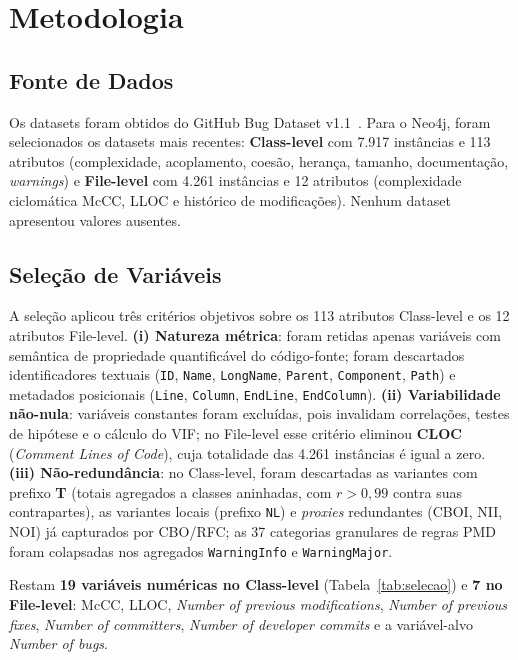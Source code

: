\documentclass[conference]{IEEEtran}
\begin{document}
\section{Metodologia}\label{sec:metodo}

\subsection{Fonte de Dados}

Os datasets foram obtidos do GitHub Bug Dataset v1.1~\cite{toth2016}. Para o Neo4j, foram selecionados os datasets mais recentes: \textbf{Class-level} com 7.917 instâncias e 113 atributos (complexidade, acoplamento, coesão, herança, tamanho, documentação, \textit{warnings}) e \textbf{File-level} com 4.261 instâncias e 12 atributos (complexidade ciclomática McCC, LLOC e histórico de modificações). Nenhum dataset apresentou valores ausentes.

\subsection{Seleção de Variáveis}

A seleção aplicou três critérios objetivos sobre os 113 atributos Class-level e os 12 atributos File-level. \textbf{(i) Natureza métrica}: foram retidas apenas variáveis com semântica de propriedade quantificável do código-fonte; foram descartados identificadores textuais (\texttt{ID}, \texttt{Name}, \texttt{LongName}, \texttt{Parent}, \texttt{Component}, \texttt{Path}) e metadados posicionais (\texttt{Line}, \texttt{Column}, \texttt{EndLine}, \texttt{EndColumn}). \textbf{(ii) Variabilidade não-nula}: variáveis constantes foram excluídas, pois invalidam correlações, testes de hipótese e o cálculo do VIF; no File-level esse critério eliminou \textbf{CLOC} (\textit{Comment Lines of Code}), cuja totalidade das 4.261 instâncias é igual a zero. \textbf{(iii) Não-redundância}: no Class-level, foram descartadas as variantes com prefixo \textbf{T} (totais agregados a classes aninhadas, com $r > 0{,}99$ contra suas contrapartes), as variantes locais (prefixo \texttt{NL}) e \textit{proxies} redundantes (CBOI, NII, NOI) já capturados por CBO/RFC; as 37 categorias granulares de regras PMD foram colapsadas nos agregados \texttt{WarningInfo} e \texttt{WarningMajor}.

Restam \textbf{19 variáveis numéricas no Class-level} (Tabela~\ref{tab:selecao}) e \textbf{7 no File-level}: McCC, LLOC, \textit{Number of previous modifications}, \textit{Number of previous fixes}, \textit{Number of committers}, \textit{Number of developer commits} e a variável-alvo \textit{Number of bugs}.
\end{document}
